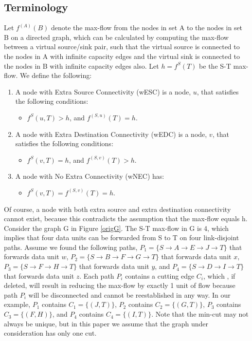 \documentclass[conference]{IEEEtran}
\begin{document}
\subsection{Terminology}
Let $f^{(A)}(B)$ denote the max-flow from the nodes in set A to the nodes in set B on a directed graph, which can be calculated by computing the max-flow between a virtual source/sink pair, such that the virtual source is connected to the nodes in A with infinite capacity edges and the virtual sink is connected to the nodes in B with infinite capacity edges also. Let $h = f^S(T) $ be the S-T max-flow. We define the following:

\begin{enumerate}
\item A node with Extra Source Connectivity (wESC) is a node, $u$, that satisfies the following conditions:
\begin{itemize}
\item $f^{S}(u,T) > h$, and $f^{(S,u)}(T) = h$.
\end{itemize}
\item A node with Extra Destination Connectivity (wEDC) is a node, $v$, that satisfies the following conditions:
\begin{itemize}
\item $f^{S}(v,T) = h$, and $f^{(S,v)}(T) > h$.
\end{itemize}
\item A node with No Extra Connectivity (wNEC) has:
\begin{itemize}
\item $f^{S}(v,T) = f^{(S,v)}(T) = h$.
\end{itemize}
\end{enumerate}

Of course, a node with both extra source and extra destination connectivity cannot exist, because this contradicts the assumption that the max-flow equals h. Consider the graph G in Figure \ref{origG}. The S-T max-flow in G is 4, which implies that four data units can be forwarded from S to T on four link-disjoint paths. Assume we found the following paths, $P_1 = \{S \rightarrow A \rightarrow E \rightarrow J \rightarrow T\}$ that forwards data unit $w$, $P_2 = \{S \rightarrow B \rightarrow F \rightarrow G \rightarrow T\}$ that forwards data unit $x$, $P_3 = \{S \rightarrow F \rightarrow H \rightarrow T\}$ that forwards data unit $y$, and  $P_4 = \{S \rightarrow D \rightarrow I \rightarrow T\}$ that forwards data unit $z$. Each path $P_i$ contains a cutting edge $C_i$, which , if deleted, will result in reducing the max-flow by exactly 1 unit of flow because path $P_i$ will be disconnected and cannot be reestablished in any way. In our example, $P_1$ contains $C_1=\{(J,T)\}$, $P_2$ contains $C_2=\{(G,T)\}$, $P_3$ contains $C_3=\{(F,H)\}$, and $P_4$ contains $C_4=\{(I,T)\}$. Note that the min-cut may not always be unique, but in this paper we assume that the graph under consideration has only one cut.
\end{document}
